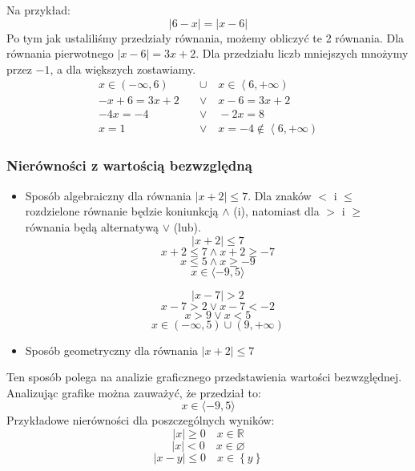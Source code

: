 \documentclass[12pt, a4paper]{article}
\begin{document}
Na przykład:
$$\left|6-x\right|=\left|x-6\right|$$
Po tym jak ustaliliśmy przedziały równania, możemy obliczyć te 2 równania.
Dla równania pierwotnego $\left|x-6\right|=3x+2$.
Dla przedziału liczb mniejszych mnożymy przez $-1$, a dla większych zostawiamy.
\begin{align*}
x \in \left( -\infty , 6\right) \quad & \cup \quad x \in \left\langle 6, +\infty \right) \\
-x+6=3x+2 \quad & \vee \quad x-6=3x+2 \\
-4x = -4 \quad & \vee \quad -2x = 8 \\
x = 1 \quad & \vee \quad x = -4 \notin \left\langle6, +\infty\right)
\end{align*}


\subsubsection{Nierówności z wartością bezwzględną}
\begin{itemize}
  \item Sposób algebraiczny dla równania $\left|x + 2\right| \leq 7$. Dla znaków $<$ i $\leq$ rozdzielone równanie będzie
    koniunkcją $\wedge$ (i), natomiast dla $>$ i $\geq$ równania będą alternatywą $\vee$ (lub).
      $$\left| x+2 \right| \leq 7$$
      $$x+2 \leq 7 \wedge x+2\geq -7$$
      $$x \leq 5 \wedge x \geq -9$$
      $$x \in \langle -9,5 \rangle$$

      $$\left| x-7 \right| > 2$$
      $$x-7 > 2 \vee x-7 < -2$$
      $$x > 9 \vee x < 5$$
      $$x \in \left(-\infty, 5\right) \cup \left(9, +\infty \right)$$
  \item Sposób geometryczny dla równania $\left|x + 2\right| \leq 7$
    \begin{center}
    \end{center}
\end{itemize}
Ten sposób polega na analizie graficznego przedstawienia wartości bezwzględnej. Analizując grafike można zauważyć, że przedział to:
$$x \in \langle-9, 5\rangle$$
Przykładowe nierówności dla poszczególnych wyników:
$$\left|x\right|\geq0 \quad x \in \mathbb{R}$$
$$\left|x\right|<0 \quad x \in \varnothing$$
$$\left|x - y\right|\leq0 \quad x \in \left\{y\right\}$$
\end{document}
